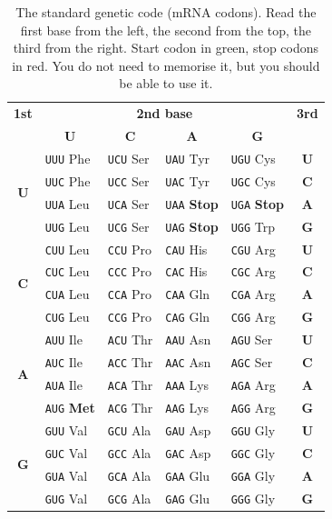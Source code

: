 \documentclass[11pt, oneside]{book}
\begin{document}
\begin{table}[htbp]
\centering
\small
\renewcommand{\arraystretch}{1.08}
\begin{tabular}{@{}c|llll|c@{}}
\toprule
\textbf{1st} & \multicolumn{4}{c|}{\textbf{2nd base}} & \textbf{3rd} \\
 & \multicolumn{1}{c}{\textbf{U}} & \multicolumn{1}{c}{\textbf{C}} & \multicolumn{1}{c}{\textbf{A}} & \multicolumn{1}{c|}{\textbf{G}} & \\
\midrule
\multirow{4}{*}{\textbf{U}} & \texttt{UUU} Phe & \texttt{UCU} Ser & \texttt{UAU} Tyr & \texttt{UGU} Cys & \textbf{U} \\
 & \texttt{UUC} Phe & \texttt{UCC} Ser & \texttt{UAC} Tyr & \texttt{UGC} Cys & \textbf{C} \\
 & \texttt{UUA} Leu & \texttt{UCA} Ser & \texttt{UAA} \textbf{\color{thm@frame}Stop} & \texttt{UGA} \textbf{\color{thm@frame}Stop} & \textbf{A} \\
 & \texttt{UUG} Leu & \texttt{UCG} Ser & \texttt{UAG} \textbf{\color{thm@frame}Stop} & \texttt{UGG} Trp & \textbf{G} \\
\midrule
\multirow{4}{*}{\textbf{C}} & \texttt{CUU} Leu & \texttt{CCU} Pro & \texttt{CAU} His & \texttt{CGU} Arg & \textbf{U} \\
 & \texttt{CUC} Leu & \texttt{CCC} Pro & \texttt{CAC} His & \texttt{CGC} Arg & \textbf{C} \\
 & \texttt{CUA} Leu & \texttt{CCA} Pro & \texttt{CAA} Gln & \texttt{CGA} Arg & \textbf{A} \\
 & \texttt{CUG} Leu & \texttt{CCG} Pro & \texttt{CAG} Gln & \texttt{CGG} Arg & \textbf{G} \\
\midrule
\multirow{4}{*}{\textbf{A}} & \texttt{AUU} Ile & \texttt{ACU} Thr & \texttt{AAU} Asn & \texttt{AGU} Ser & \textbf{U} \\
 & \texttt{AUC} Ile & \texttt{ACC} Thr & \texttt{AAC} Asn & \texttt{AGC} Ser & \textbf{C} \\
 & \texttt{AUA} Ile & \texttt{ACA} Thr & \texttt{AAA} Lys & \texttt{AGA} Arg & \textbf{A} \\
 & \texttt{AUG} \textbf{\color{ex@frame}Met} & \texttt{ACG} Thr & \texttt{AAG} Lys & \texttt{AGG} Arg & \textbf{G} \\
\midrule
\multirow{4}{*}{\textbf{G}} & \texttt{GUU} Val & \texttt{GCU} Ala & \texttt{GAU} Asp & \texttt{GGU} Gly & \textbf{U} \\
 & \texttt{GUC} Val & \texttt{GCC} Ala & \texttt{GAC} Asp & \texttt{GGC} Gly & \textbf{C} \\
 & \texttt{GUA} Val & \texttt{GCA} Ala & \texttt{GAA} Glu & \texttt{GGA} Gly & \textbf{A} \\
 & \texttt{GUG} Val & \texttt{GCG} Ala & \texttt{GAG} Glu & \texttt{GGG} Gly & \textbf{G} \\
\bottomrule

\end{tabular}
\caption{The standard genetic code (mRNA codons). Read the first base from the
left, the second from the top, the third from the right. Start codon in
green, stop codons in red. You do not need to memorise it, but you should be
able to use it.}
\label{tab:codons}
\end{table}
\end{document}
